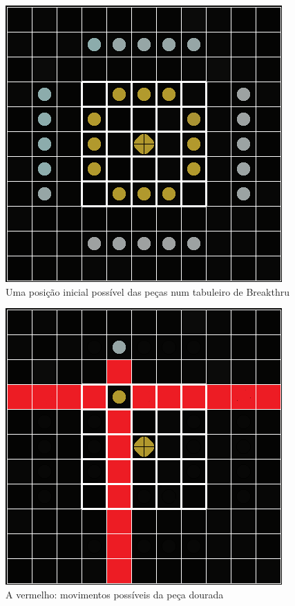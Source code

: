 \documentclass[a4paper]{article}
\begin{document}
\begin{figure}
\centering
\includegraphics[scale=1]{Breakthru_board.png} 
\centering 
\caption{Uma posição inicial possível das peças num tabuleiro de Breakthru}
\label{fig:init}
\end{figure}
\begin{figure}
\centering
\includegraphics[scale=1]{Breakthru_moves.png}
\caption{A vermelho: movimentos possíveis da peça dourada}
\label{fig:captures}
\end{figure}
\end{document}
